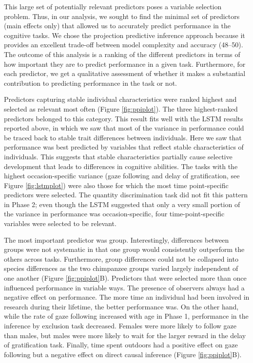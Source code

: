 \documentclass[
  man,floatsintext]{apa6}
\begin{document}
This large set of potentially relevant predictors poses a variable selection problem. Thus, in our analysis, we sought to find the minimal set of predictors (main effects only) that allowed us to accurately predict performance in the cognitive tasks. We chose the projection predictive inference approach because it provides an excellent trade-off between model complexity and accuracy (48--50). The outcome of this analysis is a ranking of the different predictors in terms of how important they are to predict performance in a given task. Furthermore, for each predictor, we get a qualitative assessment of whether it makes a substantial contribution to predicting performance in the task or not.

Predictors capturing stable individual characteristics were ranked highest and selected as relevant most often (Figure \ref{fig:ppiplot}). The three highest-ranked predictors belonged to this category. This result fits well with the LSTM results reported above, in which we saw that most of the variance in performance could be traced back to stable trait differences between individuals. Here we saw that performance was best predicted by variables that reflect stable characteristics of individuals. This suggests that stable characteristics partially cause selective development that leads to differences in cognitive abilities. The tasks with the highest occasion-specific variance (gaze following and delay of gratification, see Figure \ref{fig:lstmplot}) were also those for which the most time point-specific predictors were selected. The quantity discrimination task did not fit this pattern in Phase 2; even though the LSTM suggested that only a very small portion of the variance in performance was occasion-specific, four time-point-specific variables were selected to be relevant.

The most important predictor was group. Interestingly, differences between groups were not systematic in that one group would consistently outperform the others across tasks. Furthermore, group differences could not be collapsed into species differences as the two chimpanzee groups varied largely independent of one another (Figure \ref{fig:ppiplot}B). Predictors that were selected more than once influenced performance in variable ways. The presence of observers always had a negative effect on performance. The more time an individual had been involved in research during their lifetime, the better performance was. On the other hand, while the rate of gaze following increased with age in Phase 1, performance in the inference by exclusion task decreased. Females were more likely to follow gaze than males, but males were more likely to wait for the larger reward in the delay of gratification task. Finally, time spent outdoors had a positive effect on gaze following but a negative effect on direct causal inference (Figure \ref{fig:ppiplot}B).
\end{document}
